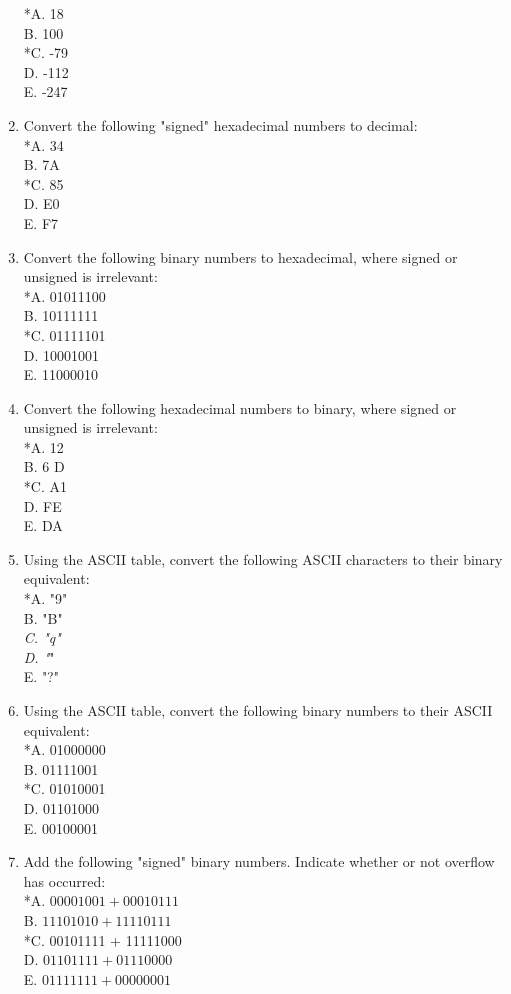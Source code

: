\documentclass[10pt]{article}
\begin{document}
\begin{enumerate}
*A. 18\\
B. 100\\
*C. -79\\
D. -112\\
E. -247
  \item Convert the following "signed" hexadecimal numbers to decimal:\\
*A. 34\\
B. 7A\\
*C. 85\\
D. E0\\
E. F7
  \item Convert the following binary numbers to hexadecimal, where signed or unsigned is irrelevant:\\
*A. 01011100\\
B. 10111111\\
*C. 01111101\\
D. 10001001\\
E. 11000010
  \item Convert the following hexadecimal numbers to binary, where signed or unsigned is irrelevant:\\
*A. 12\\
B. 6 D\\
*C. A1\\
D. FE\\
E. DA
  \item Using the ASCII table, convert the following ASCII characters to their binary equivalent:\\
*A. "9"\\
B. "B"\\
\textit{C. "q"\\
D. "}"\\
E. "?"
  \item Using the ASCII table, convert the following binary numbers to their ASCII equivalent:\\
*A. 01000000\\
B. 01111001\\
*C. 01010001\\
D. 01101000\\
E. 00100001
  \item Add the following "signed" binary numbers. Indicate whether or not overflow has occurred:\\
*A. $00001001+00010111$\\
B. $11101010+11110111$\\
*C. 00101111 + 11111000\\
D. $01101111+01110000$\\
E. $01111111+00000001$

\end{enumerate}
\end{document}
